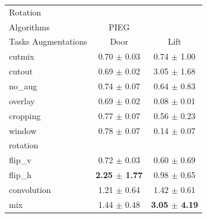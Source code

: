 \begin{tabular}{lcc}
Rotation & & \\
Algorithms & PIEG & \\
Tasks Augmentations & Door & Lift \\
cutmix          & 0.70 $\pm$ 0.03 & 0.74 $\pm$ 1.00 \\
cutout          & 0.69 $\pm$ 0.02 & 3.05 $\pm$ 1.68 \\
no\_aug         & 0.74 $\pm$ 0.07 & 0.64 $\pm$ 0.83 \\
overlay         & 0.69 $\pm$ 0.02 & 0.08 $\pm$ 0.01 \\
cropping        & 0.77 $\pm$ 0.07 & 0.56 $\pm$ 0.23 \\
window          & 0.78 $\pm$ 0.07 & 0.14 $\pm$ 0.07 \\
rotation        &  &  \\
flip\_v         & 0.72 $\pm$ 0.03 & 0.60 $\pm$ 0.69 \\
flip\_h         & \textbf{2.25 $\pm$ 1.77} & 0.98 $\pm$ 0.65 \\
convolution     & 1.21 $\pm$ 0.64 & 1.42 $\pm$ 0.61 \\
mix             & 1.44 $\pm$ 0.48 & \textbf{3.05 $\pm$ 4.19} \\
\end{tabular}